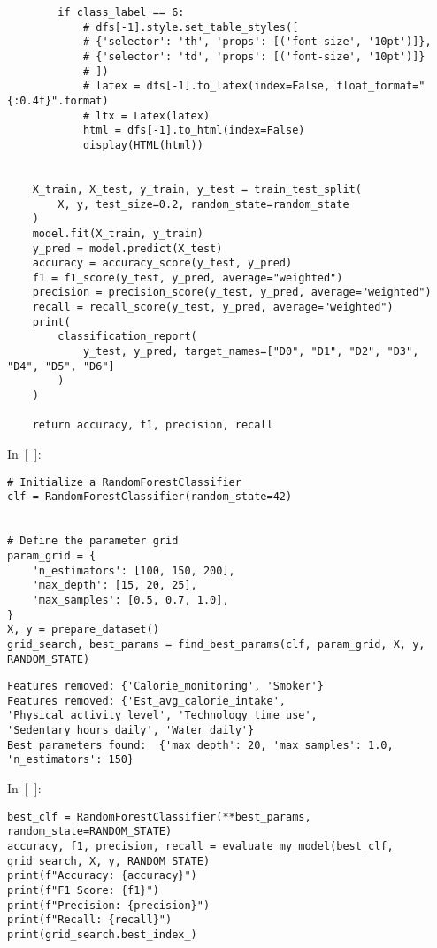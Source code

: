 \documentclass[
  english,
]{article}
\begin{document}
\begin{verbatim}
        if class_label == 6:
            # dfs[-1].style.set_table_styles([
            # {'selector': 'th', 'props': [('font-size', '10pt')]},
            # {'selector': 'td', 'props': [('font-size', '10pt')]}
            # ])
            # latex = dfs[-1].to_latex(index=False, float_format="{:0.4f}".format)
            # ltx = Latex(latex)
            html = dfs[-1].to_html(index=False)
            display(HTML(html))


    X_train, X_test, y_train, y_test = train_test_split(
        X, y, test_size=0.2, random_state=random_state
    )
    model.fit(X_train, y_train)
    y_pred = model.predict(X_test)
    accuracy = accuracy_score(y_test, y_pred)
    f1 = f1_score(y_test, y_pred, average="weighted")
    precision = precision_score(y_test, y_pred, average="weighted")
    recall = recall_score(y_test, y_pred, average="weighted")
    print(
        classification_report(
            y_test, y_pred, target_names=["D0", "D1", "D2", "D3", "D4", "D5", "D6"]
        )
    )

    return accuracy, f1, precision, recall
\end{verbatim}

In~{[}~{]}:

\begin{verbatim}
# Initialize a RandomForestClassifier
clf = RandomForestClassifier(random_state=42)


# Define the parameter grid
param_grid = {
    'n_estimators': [100, 150, 200],
    'max_depth': [15, 20, 25],
    'max_samples': [0.5, 0.7, 1.0],
}
X, y = prepare_dataset()
grid_search, best_params = find_best_params(clf, param_grid, X, y, RANDOM_STATE)
\end{verbatim}

\begin{verbatim}
Features removed: {'Calorie_monitoring', 'Smoker'}
Features removed: {'Est_avg_calorie_intake', 'Physical_activity_level', 'Technology_time_use', 'Sedentary_hours_daily', 'Water_daily'}
Best parameters found:  {'max_depth': 20, 'max_samples': 1.0, 'n_estimators': 150}
\end{verbatim}

In~{[}~{]}:

\begin{verbatim}
best_clf = RandomForestClassifier(**best_params, random_state=RANDOM_STATE)
accuracy, f1, precision, recall = evaluate_my_model(best_clf, grid_search, X, y, RANDOM_STATE)
print(f"Accuracy: {accuracy}")
print(f"F1 Score: {f1}")
print(f"Precision: {precision}")
print(f"Recall: {recall}")
print(grid_search.best_index_)
\end{verbatim}
\end{document}
